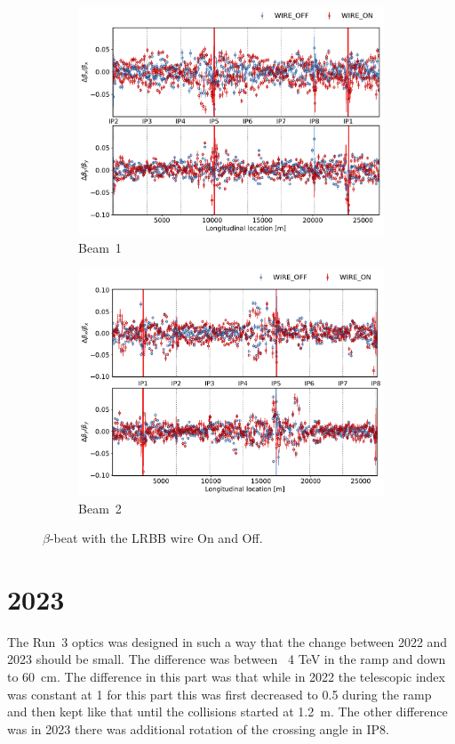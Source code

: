 \documentclass{cernatsnote}
\begin{document}
\begin{figure}[ht]
\begin{subfigure}{.5\textwidth}
  \centering
  \includegraphics[width=.8\linewidth]{wire/beam1_beta_beat.pdf}  
  \caption{Beam~1}
\end{subfigure}
\begin{subfigure}{.5\textwidth}
  \centering
  \includegraphics[width=.8\linewidth]{wire/beam2_beta_beat.pdf}  
  \caption{Beam~2}
\end{subfigure}
\caption{$\beta$-beat with the LRBB wire On and Off.}
\label{fig:before_after_pre_cycle}
\end{figure}
\section{2023}
The Run~3 optics was designed in such a way that the change between 2022 and 2023 should be small. The difference was between ~4 TeV in the ramp and down to 60~cm. The difference in this part was that while in 2022 the telescopic index was constant at 1 for this part this was first decreased to 0.5 during the ramp and then kept like that until the collisions started at 1.2~m. The other difference was in 2023 there was additional rotation of the crossing angle in IP8. 
\end{document}
